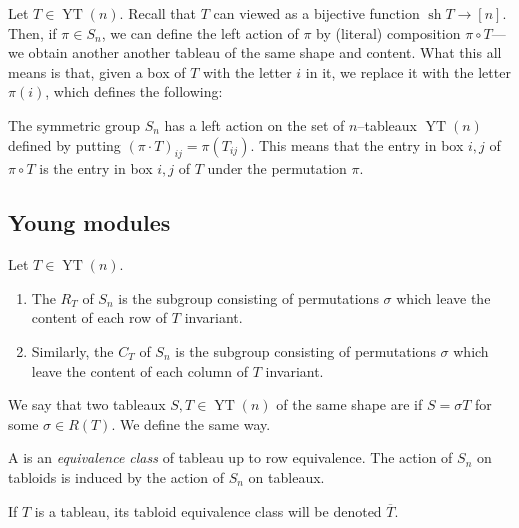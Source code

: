 \documentclass{article}
\DeclareMathOperator{\sh}{sh}
\DeclareMathOperator{\YT}{YT}
\begin{document}
Let $T \in \YT(n)$.
Recall that $T$ can viewed as a bijective function $\sh T \to [n]$.
Then, if $\pi \in S_n$, we can define the left action of $\pi$ by (literal) composition $\pi \circ T$--- we obtain another another tableau of the same shape and content.
What this all means is that, given a box of $T$ with the letter $i$ in it, we replace it with the letter $\pi(i)$, which defines the following:

\begin{definition}
    The symmetric group $S_n$ has a left action on the set of $n$--tableaux $\YT(n)$ defined by putting $(\pi \cdot T)_{ij} = \pi (T_{ij})$.
    This means that the entry in box $i,j$ of $\pi \circ T$ is the entry in box $i,j$ of $T$ under the permutation $\pi$.
\end{definition}

\subsection{Young modules}

\begin{definition}
    Let $T \in \YT(n)$.
    \begin{enumerate}[label=(\alph*)]
        \item 
    The  $R_T$ of $S_n$ is the subgroup consisting of permutations $\sigma$ which leave the content of each row of $T$ invariant.
        \item 
            Similarly, the  $C_T$ of $S_n$ is the subgroup consisting of permutations $\sigma$ which leave the content of each column of $T$ invariant.
    \end{enumerate}
\end{definition}

\begin{definition}
    We say that two tableaux $S,T \in \YT(n)$ of the same shape are  if $S = \sigma T$ for some $\sigma \in R(T)$.
    We define  the same way.
\end{definition}


\begin{definition}
    A  is an \textit{equivalence class} of tableau up to row equivalence.
    The action of $S_n$ on tabloids is induced by the action of $S_n$ on tableaux.

    If $T$ is a tableau, its tabloid equivalence class will be denoted $\overline{T}$.
\end{definition}
\end{document}

